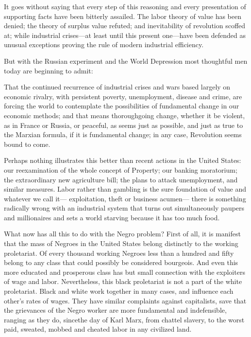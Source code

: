 \documentclass[letterpaper,10pt,english]{jupyterBook}
\begin{document}
\sphinxAtStartPar
It goes without saying that every step of this reasoning and every presentation of supporting facts have been bitterly assailed. The labor theory of value has been denied; the theory of surplus value refuted; and inevitability of revolution scoffed at; while industrial crises—at least until this present one—have been defended as unusual exceptions proving the rule of modern industrial efficiency.

\sphinxAtStartPar
But with the Russian experiment and the World Depression most thoughtful men today are beginning to admit:

\sphinxAtStartPar
That the continued recurrence of industrial crises and wars based largely on economic rivalry, with persistent poverty, unemployment, disease and crime, are forcing the world to contemplate the possibilities of fundamental change in our economic methods; and that means thorough\sphinxhyphen{}going change, whether it be violent, as in France or Russia, or peaceful, as seems just as possible, and just as true to the Marxian formula, if it is fundamental change; in any case, Revolution seems bound to come.

\sphinxAtStartPar
Perhaps nothing illustrates this better than recent actions in the United States: our re\sphinxhyphen{}examination of the whole concept of Property; our banking moratorium; the extraordinary new agriculture bill; the plans to attack unemployment, and similar measures. Labor rather than gambling is the sure foundation of value and whatever we call it— exploitation, theft or business acumen— there is something radically wrong with an industrial system that turns out simultaneously paupers and millionaires and sets a world starving because it has too much food.

\sphinxAtStartPar
What now has all this to do with the Negro problem? First of all, it is manifest that the mass of Negroes in the United States belong distinctly to the working proletariat. Of every thousand working Negroes less than a hundred and fifty belong to any class that could possibly be considered bourgeois. And even this more educated and prosperous class has but small connection with the exploiters of wage and labor. Nevertheless, this black proletariat is not a part of the white proletariat. Black and white work together in many cases, and influence each other’s rates of wages. They have similar complaints against capitalists, save that the grievances of the Negro worker are more fundamental and indefensible, ranging as they do, since\sphinxhyphen{}the day of Karl Marx, from chattel slavery, to the worst paid, sweated, mobbed and cheated labor in any civilized land.
\end{document}
